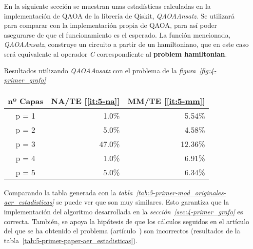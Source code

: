 En la siguiente sección se muestran unas estadísticas calculadas en la implementación de QAOA de la librería de Qiskit, \textit{QAOAAnsatz}.
Se utilizará para comparar con la implementación propia de QAOA, para así poder asegurarse de que el funcionamiento es el esperado.
La función mencionada, \textit{QAOAAnsatz}, construye un circuito a partir de un hamiltoniano, que en este caso será equivalente al operador \textit{C} correspondiente al \textbf{problem hamiltonian}.

\begin{table}[htbp]{}{Resultados utilizando \textit{QAOAAnsatz} con el problema de la \textit{figura~\ref{fig:4-primer_grafo}}}
  \centering
  \begin{tabular}{|c|r|r|}
    \hline
    \textbf{nº Capas} & \textbf{NA/TE} [\ref{it:5-na}] & \textbf{MM/TE} [\ref{it:5-mm}] \\ \hline
    p = 1 &  1.0\% &  5.54\% \\ \hline
    p = 2 &  5.0\% &  4.58\% \\ \hline
    p = 3 & 47.0\% & 12.36\% \\ \hline
    p = 4 &  1.0\% &  6.91\% \\ \hline
    p = 5 &  5.0\% &  6.34\% \\ \hline
  \end{tabular}
\end{table}

Comparando la tabla generada con la \textit{tabla~\ref{tab:5-primer-mod_originales-aer_estadisticas}} se puede ver que son muy similares.
Esto garantiza que la implementación del algoritmo desarrollada en la \textit{sección~\ref{sec:4-primer_grafo}} es correcta.
También, se apoya la hipótesis de que los cálculos seguidos en el artículo del que se ha obtenido el problema (artículo~\cite{multi-objective_routing_optimization}) son incorrectos (resultados de la tabla~\ref{tab:5-primer-paper-aer_estadisticas}).


